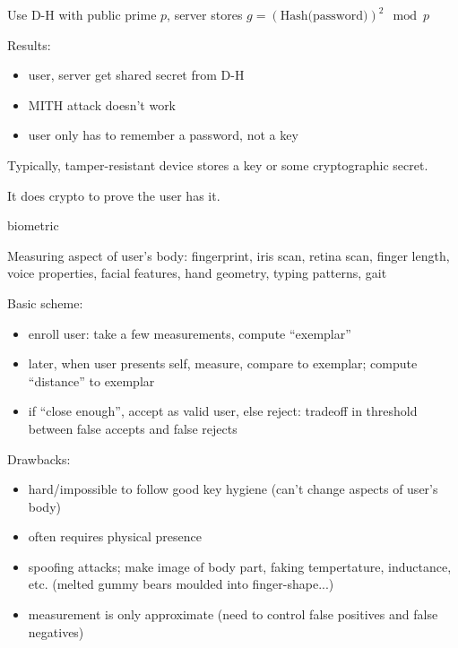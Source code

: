 \begin{itemize}
        Use D-H with public prime $p$, server stores
        $g = (\text{Hash(password)})^2 \mod p$

        Results:
        \begin{itemize}
            \item user, server get shared secret from D-H
            \item MITH attack doesn't work
            \item user only has to remember a password, not a key
        \end{itemize}
\end{itemize}
Typically, tamper-resistant device stores a key or some cryptographic secret.

It does crypto to prove the user has it.
\begin{definition}{biometric}

Measuring aspect of user's body: fingerprint, iris scan, retina scan, finger
length, voice properties, facial features, hand geometry, typing patterns, gait
\end{definition}
Basic scheme:
\begin{itemize}
    \item enroll user: take a few measurements, compute ``exemplar''
    \item later, when user presents self, measure, compare to exemplar; compute
            ``distance'' to exemplar
    \item if ``close enough'', accept as valid user, else reject: tradeoff in
    threshold between false accepts and false rejects
\end{itemize}
Drawbacks:
\begin{itemize}
    \item hard/impossible to follow good key hygiene (can't change aspects of user's body)
    \item often requires physical presence
    \item spoofing attacks; make image of body part, faking tempertature,
            inductance, etc. (melted gummy bears moulded into finger-shape...)
    \item measurement is only approximate (need to control false positives and false negatives)
\end{itemize}
